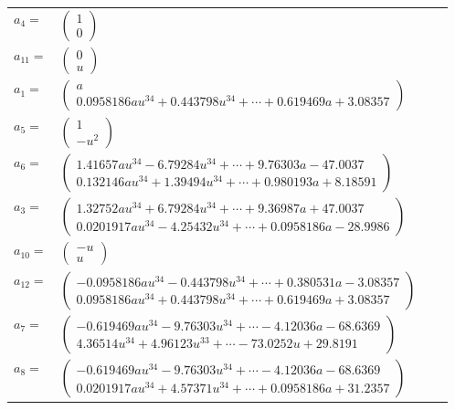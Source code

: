 \documentclass[1p]{elsarticle_modified}
\theoremstyle{definition}
\begin{document}
\begin{tabular}{m{7pt} m{180pt} m{7pt} m{180pt} }
\flushright $a_{4}=$&$\begin{pmatrix}1\\0\end{pmatrix}$ \\
\flushright $a_{11}=$&$\begin{pmatrix}0\\u\end{pmatrix}$ \\
\flushright $a_{1}=$&$\begin{pmatrix}a\\0.0958186 a u^{34}+0.443798 u^{34}+\cdots+0.619469 a+3.08357\end{pmatrix}$ \\
\flushright $a_{5}=$&$\begin{pmatrix}1\\- u^2\end{pmatrix}$ \\
\flushright $a_{6}=$&$\begin{pmatrix}1.41657 a u^{34}-6.79284 u^{34}+\cdots+9.76303 a-47.0037\\0.132146 a u^{34}+1.39494 u^{34}+\cdots+0.980193 a+8.18591\end{pmatrix}$ \\
\flushright $a_{3}=$&$\begin{pmatrix}1.32752 a u^{34}+6.79284 u^{34}+\cdots+9.36987 a+47.0037\\0.0201917 a u^{34}-4.25432 u^{34}+\cdots+0.0958186 a-28.9986\end{pmatrix}$ \\
\flushright $a_{10}=$&$\begin{pmatrix}- u\\u\end{pmatrix}$ \\
\flushright $a_{12}=$&$\begin{pmatrix}-0.0958186 a u^{34}-0.443798 u^{34}+\cdots+0.380531 a-3.08357\\0.0958186 a u^{34}+0.443798 u^{34}+\cdots+0.619469 a+3.08357\end{pmatrix}$ \\
\flushright $a_{7}=$&$\begin{pmatrix}-0.619469 a u^{34}-9.76303 u^{34}+\cdots-4.12036 a-68.6369\\4.36514 u^{34}+4.96123 u^{33}+\cdots-73.0252 u+29.8191\end{pmatrix}$ \\
\flushright $a_{8}=$&$\begin{pmatrix}-0.619469 a u^{34}-9.76303 u^{34}+\cdots-4.12036 a-68.6369\\0.0201917 a u^{34}+4.57371 u^{34}+\cdots+0.0958186 a+31.2357\end{pmatrix}$ \\

\end{tabular}
\end{document}
